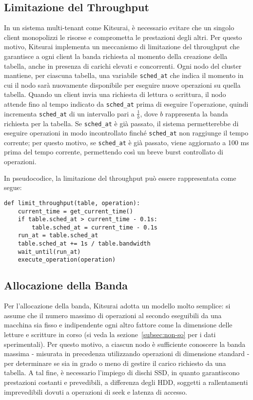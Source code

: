 \subsection{Limitazione del Throughput}
\label{subsec:limitazione-throughput}

In un sistema multi-tenant come Kitsurai, è necessario evitare che un singolo client monopolizzi le risorse e comprometta le prestazioni degli altri.
Per questo motivo, Kitsurai implementa un meccanismo di limitazione del throughput che garantisce a ogni client la banda richiesta al momento della creazione della tabella, anche in presenza di carichi elevati e concorrenti.
Ogni nodo del cluster mantiene, per ciascuna tabella, una variabile \texttt{sched\_at} che indica il momento in cui il nodo sarà nuovamente disponibile per eseguire nuove operazioni su quella tabella.
Quando un client invia una richiesta di lettura o scrittura, il nodo attende fino al tempo indicato da \texttt{sched\_at} prima di eseguire l'operazione, quindi incrementa \texttt{sched\_at} di un intervallo pari a $\frac{1}{b}$, dove $b$ rappresenta la banda richiesta per la tabella.
Se \texttt{sched\_at} è già passato, il sistema permetterebbe di eseguire operazioni in modo incontrollato finché \texttt{sched\_at} non raggiunge il tempo corrente; per questo motivo, se \texttt{sched\_at} è già passato, viene aggiornato a 100 ms prima del tempo corrente, permettendo così un breve burst controllato di operazioni.

\begin{samepage}
\noindent In pseudocodice, la limitazione del throughput può essere rappresentata come segue:
\begin{verbatim}
def limit_throughput(table, operation):
    current_time = get_current_time()
    if table.sched_at > current_time - 0.1s:
        table.sched_at = current_time - 0.1s
    run_at = table.sched_at
    table.sched_at += 1s / table.bandwidth
    wait_until(run_at)
    execute_operation(operation)
\end{verbatim}
\end{samepage}

\subsection{Allocazione della Banda}
\label{subsec:allocazione-banda}

Per l'allocazione della banda, Kitsurai adotta un modello molto semplice: si assume che il numero massimo di operazioni al secondo eseguibili da una macchina sia fisso e indipendente ogni altro fattore come la dimensione delle letture e scritture in corso (si veda la sezione~\ref{subsec:non-so} per i dati sperimentali).
Per questo motivo, a ciascun nodo è sufficiente conoscere la banda massima - misurata in precedenza utilizzando operazioni di dimensione standard - per determinare se sia in grado o meno di gestire il carico richiesto da una tabella.
A tal fine, è necessario l'impiego di dischi SSD, in quanto garantiscono prestazioni costanti e prevedibili, a differenza degli HDD, soggetti a rallentamenti imprevedibili dovuti a operazioni di seek e latenza di accesso.

